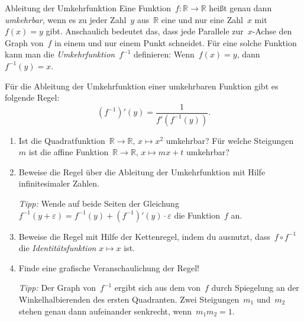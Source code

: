 \documentclass[twoside]{../zirkelblatt}
\newcommand{\RR}{\mathbb{R}}
\theoremstyle{definition}
\theoremstyle{plain}
\theoremstyle{remark}
\begin{document}
\begin{aufgabeShaded}{Ableitung der Umkehrfunktion}
Eine Funktion~$f : \RR \to \RR$ heißt genau dann \emph{umkehrbar}, wenn es zu
jeder Zahl~$y$ aus~$\RR$ eine und nur eine Zahl~$x$ mit~$f(x) = y$ gibt.
Anschaulich bedeutet das, dass jede Parallele zur~$x$-Achse den Graph von~$f$
in einem und nur einem Punkt schneidet. Für eine solche Funktion kann man die
\emph{Umkehrfunktion}~$f^{-1}$ definieren: Wenn~$f(x) = y$, dann~$f^{-1}(y) =
x$.

Für die Ableitung der Umkehrfunktion einer umkehrbaren Funktion gibt es
folgende Regel:
\[ (f^{-1})'(y) = \frac{1}{f'(f^{-1}(y))}. \]
\begin{enumerate}
\item Ist die Quadratfunktion~$\RR \to \RR,\,x \mapsto x^2$ umkehrbar?
Für welche Steigungen~$m$ ist die affine Funktion~$\RR \to \RR,\,x \mapsto mx+t$
umkehrbar?

\item Beweise die Regel über die Ableitung der Umkehrfunktion mit Hilfe
infinitesimaler Zahlen.

\emph{Tipp:} Wende auf beide Seiten der Gleichung~$f^{-1}(y+\varepsilon) =
f^{-1}(y) + (f^{-1})'(y) \cdot \varepsilon$ die Funktion~$f$ an.

\item Beweise die Regel mit Hilfe der Kettenregel, indem du ausnutzt, dass~$f
\circ f^{-1}$ die \emph{Identitätsfunktion} $x \mapsto x$ ist.

\item Finde eine grafische Veranschaulichung der Regel!

\emph{Tipp:} Der Graph von~$f^{-1}$ ergibt sich aus dem von~$f$ durch
Spiegelung an der Winkelhalbierenden des ersten Quadranten. Zwei
Steigungen~$m_1$ und~$m_2$ stehen genau dann aufeinander senkrecht, wenn~$m_1
m_2 = 1$.
\end{enumerate}
\end{aufgabeShaded}
\end{document}
